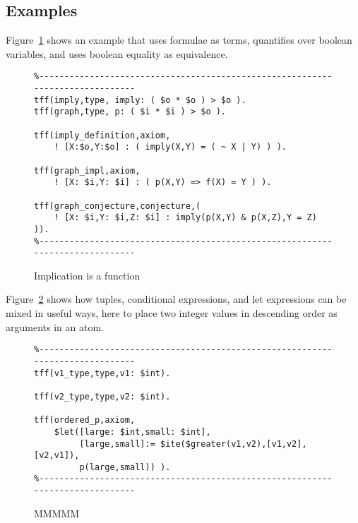 \documentclass{easychair}
\begin{document}
\subsection{Examples}
\label{Examples}

Figure~\ref{ImplicationFunction} shows an example that uses formulae as
terms, quantifies over boolean variables, and uses boolean equality as 
equivalence.

\begin{figure}[htbp]
\begin{small}
\begin{verbatim}
%------------------------------------------------------------------------------
tff(imply,type, imply: ( $o * $o ) > $o ).
tff(graph,type, p: ( $i * $i ) > $o ).

tff(imply_definition,axiom,
    ! [X:$o,Y:$o] : ( imply(X,Y) = ( ~ X | Y) ) ).

tff(graph_impl,axiom,
    ! [X: $i,Y: $i] : ( p(X,Y) => f(X) = Y ) ).

tff(graph_conjecture,conjecture,(
    ! [X: $i,Y: $i,Z: $i] : imply(p(X,Y) & p(X,Z),Y = Z) )).
%------------------------------------------------------------------------------
\end{verbatim}
\end{small}
\caption{Implication is a function}
\label{ImplicationFunction}
\end{figure}

Figure~\ref{TupleConditionalLet} shows how tuples, conditional expressions, 
and let expressions can be mixed in useful ways, here to place two integer
values in descending order as arguments in an atom.

\begin{figure}[htbp]
\begin{small}
\begin{verbatim}
%------------------------------------------------------------------------------
tff(v1_type,type,v1: $int).

tff(v2_type,type,v2: $int).

tff(ordered_p,axiom,
    $let([large: $int,small: $int],
         [large,small]:= $ite($greater(v1,v2),[v1,v2],[v2,v1]),
         p(large,small)) ).
%------------------------------------------------------------------------------
\end{verbatim}
\end{small}
\caption{MMMMM}
\label{TupleConditionalLet}
\end{figure}
\end{document}
